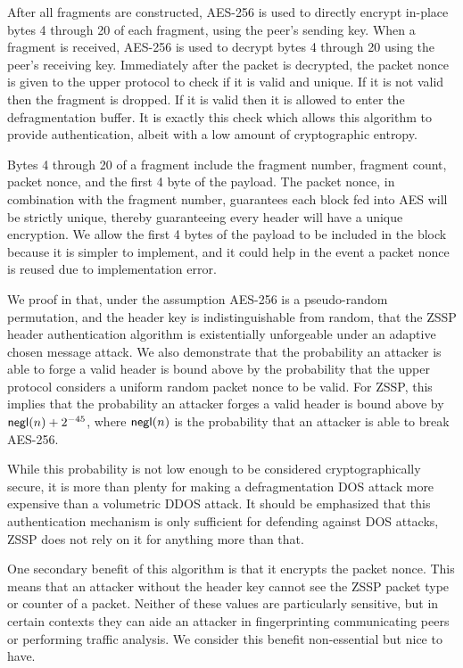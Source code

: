 \documentclass{article}
\begin{document}
After all fragments are constructed, AES-256 \cite{fips_aes} is used to directly encrypt in-place bytes 4 through 20 of each fragment, using the peer's sending key. When a fragment is received, AES-256 is used to decrypt bytes 4 through 20 using the peer's receiving key. Immediately after the packet is decrypted, the packet nonce is given to the upper protocol to check if it is valid and unique. If it is not valid then the fragment is dropped. If it is valid then it is allowed to enter the defragmentation buffer. It is exactly this check which allows this algorithm to provide authentication, albeit with a low amount of cryptographic entropy.

Bytes 4 through 20 of a fragment include the fragment number, fragment count, packet nonce, and the first 4 byte of the payload. The packet nonce, in combination with the fragment number, guarantees each block fed into AES will be strictly unique, thereby guaranteeing every header will have a unique encryption. We allow the first 4 bytes of the payload to be included in the block because it is simpler to implement, and it could help in the event a packet nonce is reused due to implementation error.

We proof in  that, under the assumption AES-256 is a pseudo-random permutation, and the header key is indistinguishable from random, that the ZSSP header authentication algorithm is existentially unforgeable under an adaptive chosen message attack. We also demonstrate that the probability an attacker is able to forge a valid header is bound above by the probability that the upper protocol considers a uniform random packet nonce to be valid. For ZSSP, this implies that the probability an attacker forges a valid header is bound above by $\text{\sf negl}(n) + 2^{-45}$, where $\text{\sf negl}(n)$ is the probability that an attacker is able to break AES-256.

While this probability is not low enough to be considered cryptographically secure, it is more than plenty for making a defragmentation DOS attack more expensive than a volumetric DDOS attack. It should be emphasized that this authentication mechanism is only sufficient for defending against DOS attacks, ZSSP does not rely on it for anything more than that.

One secondary benefit of this algorithm is that it encrypts the packet nonce. This means that an attacker without the header key cannot see the ZSSP packet type or counter of a packet. Neither of these values are particularly sensitive, but in certain contexts they can aide an attacker in fingerprinting communicating peers or performing traffic analysis. We consider this benefit non-essential but nice to have.
\end{document}
